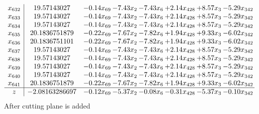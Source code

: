 \documentclass[8pt]{article}
\begin{document}
\[\begin{array}{c| c c@{\hskip 2pt} c@{\hskip 2pt} c@{\hskip 2pt} c@{\hskip 2pt} c@{\hskip 2pt} c@{\hskip 2pt} }
 x_{632}   &  19.57143027 & -0.14 x_{69} & -7.43 x_{2} & -7.43 x_{6} & +  2.14 x_{428} & +  8.57 x_{3} & -5.29 x_{342}\\
 x_{633}   &  19.57143027 & -0.14 x_{69} & -7.43 x_{2} & -7.43 x_{6} & +  2.14 x_{428} & +  8.57 x_{3} & -5.29 x_{342}\\
 x_{634}   &  19.57143027 & -0.14 x_{69} & -7.43 x_{2} & -7.43 x_{6} & +  2.14 x_{428} & +  8.57 x_{3} & -5.29 x_{342}\\
 x_{635}   &  20.1836751879 & -0.22 x_{69} & -7.67 x_{2} & -7.82 x_{6} & +  1.94 x_{428} & +  9.33 x_{3} & -6.02 x_{342}\\
 x_{636}   &  20.1836751101 & -0.22 x_{69} & -7.67 x_{2} & -7.82 x_{6} & +  1.94 x_{428} & +  9.33 x_{3} & -6.02 x_{342}\\
 x_{637}   &  19.57143027 & -0.14 x_{69} & -7.43 x_{2} & -7.43 x_{6} & +  2.14 x_{428} & +  8.57 x_{3} & -5.29 x_{342}\\
 x_{638}   &  19.57143027 & -0.14 x_{69} & -7.43 x_{2} & -7.43 x_{6} & +  2.14 x_{428} & +  8.57 x_{3} & -5.29 x_{342}\\
 x_{639}   &  19.57143027 & -0.14 x_{69} & -7.43 x_{2} & -7.43 x_{6} & +  2.14 x_{428} & +  8.57 x_{3} & -5.29 x_{342}\\
 x_{640}   &  19.57143027 & -0.14 x_{69} & -7.43 x_{2} & -7.43 x_{6} & +  2.14 x_{428} & +  8.57 x_{3} & -5.29 x_{342}\\
 x_{641}   &  20.1836751879 & -0.22 x_{69} & -7.67 x_{2} & -7.82 x_{6} & +  1.94 x_{428} & +  9.33 x_{3} & -6.02 x_{342}\\
\hline
z    &  -2.08163286697 & -0.12 x_{69} & -5.37 x_{2} & -0.08 x_{6} & -0.31 x_{428} & -5.37 x_{3} & -0.10 x_{342}\\
\end{array}\]
 After cutting plane is added 
\end{document}
